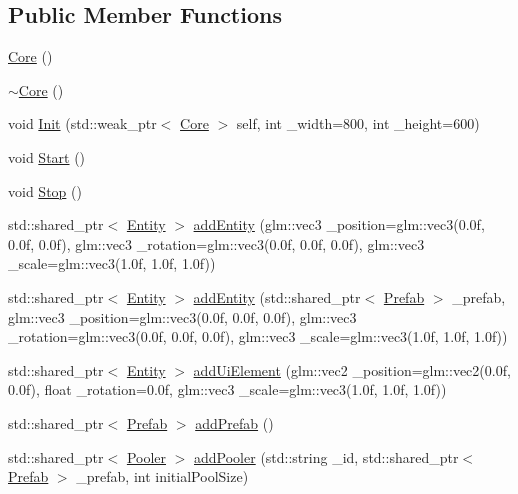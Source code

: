 \subsection*{Public Member Functions}
\begin{DoxyCompactItemize}
\item 
\hyperlink{classfrontier_1_1_core_ad4bfe6cd519ba43996f9881598d63e50}{Core} ()
\item 
\hyperlink{classfrontier_1_1_core_a4d5ae078d34758c54c517bede518e2e4}{$\sim$\+Core} ()
\item 
void \hyperlink{classfrontier_1_1_core_a0f2b7feb2638d3bf3f67919f5596ab6c}{Init} (std\+::weak\+\_\+ptr$<$ \hyperlink{classfrontier_1_1_core}{Core} $>$ self, int \+\_\+width=800, int \+\_\+height=600)
\item 
void \hyperlink{classfrontier_1_1_core_a184b56e6f852d9670168111e5e1a1bc2}{Start} ()
\item 
void \hyperlink{classfrontier_1_1_core_af73d19f41d8316a7e0a6e11137201ed9}{Stop} ()
\item 
std\+::shared\+\_\+ptr$<$ \hyperlink{classfrontier_1_1_entity}{Entity} $>$ \hyperlink{classfrontier_1_1_core_a7224247d328741220fae73fc4893bdc3}{add\+Entity} (glm\+::vec3 \+\_\+position=glm\+::vec3(0.\+0f, 0.\+0f, 0.\+0f), glm\+::vec3 \+\_\+rotation=glm\+::vec3(0.\+0f, 0.\+0f, 0.\+0f), glm\+::vec3 \+\_\+scale=glm\+::vec3(1.\+0f, 1.\+0f, 1.\+0f))
\item 
std\+::shared\+\_\+ptr$<$ \hyperlink{classfrontier_1_1_entity}{Entity} $>$ \hyperlink{classfrontier_1_1_core_a1e419fcdea7e95bc334238d425bd8377}{add\+Entity} (std\+::shared\+\_\+ptr$<$ \hyperlink{classfrontier_1_1_prefab}{Prefab} $>$ \+\_\+prefab, glm\+::vec3 \+\_\+position=glm\+::vec3(0.\+0f, 0.\+0f, 0.\+0f), glm\+::vec3 \+\_\+rotation=glm\+::vec3(0.\+0f, 0.\+0f, 0.\+0f), glm\+::vec3 \+\_\+scale=glm\+::vec3(1.\+0f, 1.\+0f, 1.\+0f))
\item 
std\+::shared\+\_\+ptr$<$ \hyperlink{classfrontier_1_1_entity}{Entity} $>$ \hyperlink{classfrontier_1_1_core_a2386af48e1509dc30a5636968732bf42}{add\+Ui\+Element} (glm\+::vec2 \+\_\+position=glm\+::vec2(0.\+0f, 0.\+0f), float \+\_\+rotation=0.\+0f, glm\+::vec3 \+\_\+scale=glm\+::vec3(1.\+0f, 1.\+0f, 1.\+0f))
\item 
std\+::shared\+\_\+ptr$<$ \hyperlink{classfrontier_1_1_prefab}{Prefab} $>$ \hyperlink{classfrontier_1_1_core_af3e1d6b2e67d82f6cd34af637da7d957}{add\+Prefab} ()
\item 
std\+::shared\+\_\+ptr$<$ \hyperlink{classfrontier_1_1_pooler}{Pooler} $>$ \hyperlink{classfrontier_1_1_core_a3447ae6e6cbb79e89e78fbdab36ce743}{add\+Pooler} (std\+::string \+\_\+id, std\+::shared\+\_\+ptr$<$ \hyperlink{classfrontier_1_1_prefab}{Prefab} $>$ \+\_\+prefab, int initial\+Pool\+Size)

\end{DoxyCompactItemize}

